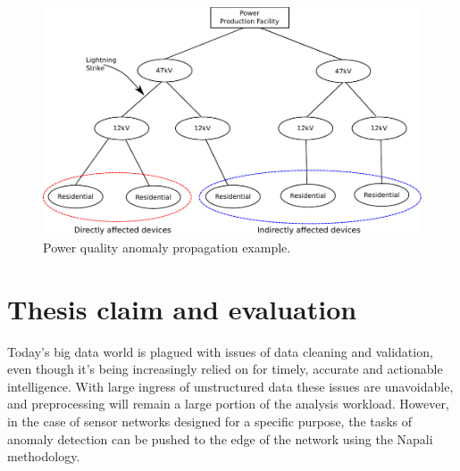 \begin{figure}[h]
    \centering
    \includegraphics[width=0.9\linewidth]{img/grid_hierarchy_cartoon.pdf}
    \caption{Power quality anomaly propagation example.}
    \label{intro:fig2}
\end{figure}

\section{Thesis claim and evaluation} \label{intro:sec:claim}

Today's big data world is plagued with issues of data cleaning and validation, even though it's being increasingly relied on for timely, accurate and actionable intelligence.
With large ingress of unstructured data these issues are unavoidable, and preprocessing will remain a large portion of the analysis workload.
However, in the case of sensor networks designed for a specific purpose, the tasks of anomaly detection can be pushed to the edge of the network using the Napali methodology.

